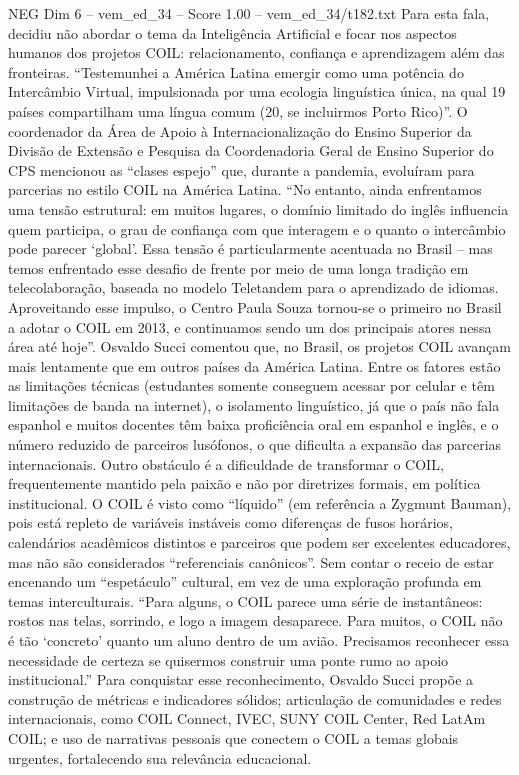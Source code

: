 \begin{textsample}{NEG Dim 6 – vem\_ed\_34 – Score 1.00 – vem\_ed\_34/t182.txt}
Para esta fala, decidiu não abordar o tema da Inteligência Artificial e focar nos aspectos humanos dos projetos COIL: relacionamento, confiança e aprendizagem além das fronteiras. “Testemunhei a América Latina emergir como uma potência do Intercâmbio Virtual, impulsionada por uma ecologia linguística única, na qual 19 países compartilham uma língua comum (20, se incluirmos Porto Rico)”.
O coordenador da Área de Apoio à Internacionalização do Ensino Superior da Divisão de Extensão e Pesquisa da Coordenadoria Geral de Ensino Superior do CPS mencionou as “clases espejo” que, durante a pandemia, evoluíram para parcerias no estilo COIL na América Latina. “No entanto, ainda enfrentamos uma tensão estrutural: em muitos lugares, o domínio limitado do inglês influencia quem participa, o grau de confiança com que interagem e o quanto o intercâmbio pode parecer ‘global’.
Essa tensão é particularmente acentuada no Brasil – mas temos enfrentado esse desafio de frente por meio de uma longa tradição em telecolaboração, baseada no modelo Teletandem para o aprendizado de idiomas.
Aproveitando esse impulso, o Centro Paula Souza tornou-se o primeiro no Brasil a adotar o COIL em 2013, e continuamos sendo um dos principais atores nessa área até hoje”.
Osvaldo Succi comentou que, no Brasil, os projetos COIL avançam mais lentamente que em outros países da América Latina.
Entre os fatores estão as limitações técnicas (estudantes somente conseguem acessar por celular e têm limitações de banda na internet), o isolamento linguístico, já que o país não fala espanhol e muitos docentes têm baixa proficiência oral em espanhol e inglês, e o número reduzido de parceiros lusófonos, o que dificulta a expansão das parcerias internacionais.
Outro obstáculo é a dificuldade de transformar o COIL, frequentemente mantido pela paixão e não por diretrizes formais, em política institucional.
O COIL é visto como “líquido” (em referência a Zygmunt Bauman), pois está repleto de variáveis instáveis como diferenças de fusos horários, calendários acadêmicos distintos e parceiros que podem ser excelentes educadores, mas não são considerados “referenciais canônicos”.
Sem contar o receio de estar encenando um “espetáculo” cultural, em vez de uma exploração profunda em temas interculturais. “Para alguns, o COIL parece uma série de instantâneos: rostos nas telas, sorrindo, e logo a imagem desaparece.
Para muitos, o COIL não é tão ‘concreto’ quanto um aluno dentro de um avião.
Precisamos reconhecer essa necessidade de certeza se quisermos construir uma ponte rumo ao apoio institucional.” Para conquistar esse reconhecimento, Osvaldo Succi propõe a construção de métricas e indicadores sólidos; articulação de comunidades e redes internacionais, como COIL Connect, IVEC, SUNY COIL Center, Red LatAm COIL; e uso de narrativas pessoais que conectem o COIL a temas globais urgentes, fortalecendo sua relevância educacional.

\end{textsample}
